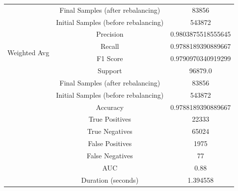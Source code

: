\begin{longtable}{|c|c|c|}
 & Final Samples (after rebalancing) & 83856 \\
 & Initial Samples (before rebalancing) & 543872 \\
\hline
\multirow{4}{*}{Weighted Avg} & Precision & 0.9803875518555645 \\
 & Recall & 0.9788189390889667 \\
 & F1 Score & 0.9790970340919299 \\
 & Support & 96879.0 \\
 & Final Samples (after rebalancing) & 83856 \\
 & Initial Samples (before rebalancing) & 543872 \\
\hline
& Accuracy & 0.9788189390889667 \\ \hline
& True Positives & 22333 \\ \hline
& True Negatives & 65024 \\ \hline
& False Positives & 1975 \\ \hline
& False Negatives & 77 \\ \hline
& AUC & 0.88 \\ \hline
& Duration (seconds) & 1.394558 \\ \hline
\end{longtable}


